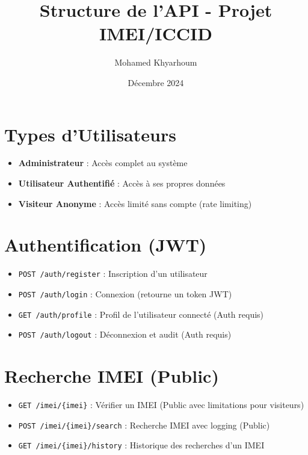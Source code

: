 \documentclass{article}
\title{Structure de l'API - Projet IMEI/ICCID}
\author{Mohamed Khyarhoum}
\date{Décembre 2024}
\begin{document}
\maketitle

\section{Types d'Utilisateurs}
\begin{itemize}
    \item \textbf{Administrateur} : Accès complet au système
    \item \textbf{Utilisateur Authentifié} : Accès à ses propres données
    \item \textbf{Visiteur Anonyme} : Accès limité sans compte (rate limiting)
\end{itemize}

\section{Authentification (JWT)}
\begin{itemize}
    \item \texttt{POST /auth/register} : Inscription d'un utilisateur
    \item \texttt{POST /auth/login} : Connexion (retourne un token JWT)
    \item \texttt{GET /auth/profile} : Profil de l'utilisateur connecté (Auth requis)
    \item \texttt{POST /auth/logout} : Déconnexion et audit (Auth requis)
\end{itemize}

\section{Recherche IMEI (Public)}
\begin{itemize}
    \item \texttt{GET /imei/\{imei\}} : Vérifier un IMEI (Public avec limitations pour visiteurs)
    \item \texttt{POST /imei/\{imei\}/search} : Recherche IMEI avec logging (Public)
    \item \texttt{GET /imei/\{imei\}/history} : Historique des recherches d'un IMEI
\end{itemize}
\end{document}
